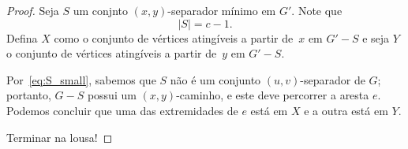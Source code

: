 \documentclass[12pt, a4paper]{article}
\theoremstyle{definition}
\begin{document}
\begin{proof}
Seja $S$ um conjnto $(x,y)$-separador mínimo em $G'$. Note que 
\begin{equation}
  \label{eq:S_small}
  |S| = c - 1.
\end{equation}
 Defina $X$ como o conjunto de vértices atingíveis a partir de~$x$ em $G' - S$ e seja $Y$ o conjunto de vértices atingíveis a partir de~$y$ em $G' - S$.

Por~\eqref{eq:S_small}, sabemos que $S$ não é um conjunto $(u,v)$-separador de $G$; portanto, $G - S$ possui um $(x,y)$-caminho, e este deve percorrer a aresta $e$. Podemos concluir que uma das extremidades de $e$ está em $X$ e a outra está em $Y$.

Terminar na lousa!






\end{proof}
\end{document}
